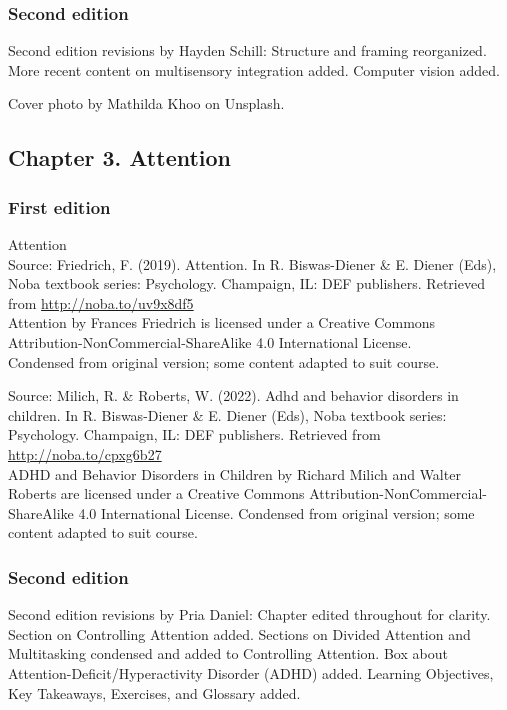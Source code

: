 \documentclass[
]{krantz}
\begin{document}
\subsubsection*{Second edition}\label{second-edition-2}


Second edition revisions by Hayden Schill: Structure and framing reorganized. More recent content on multisensory integration added. Computer vision added.

Cover photo by Mathilda Khoo on Unsplash.

\subsection*{Chapter 3. Attention}\label{chapter-3.-attention}


\subsubsection*{First edition}\label{first-edition-3}


Attention\\
Source: Friedrich, F. (2019). Attention. In R. Biswas-Diener \& E. Diener (Eds), Noba textbook series: Psychology. Champaign, IL: DEF publishers. Retrieved from \url{http://noba.to/uv9x8df5}\\
Attention by Frances Friedrich is licensed under a Creative Commons Attribution-NonCommercial-ShareAlike 4.0 International License.\\
Condensed from original version; some content adapted to suit course.

Source: Milich, R. \& Roberts, W. (2022). Adhd and behavior disorders in children. In R. Biswas-Diener \& E. Diener (Eds), Noba textbook series: Psychology. Champaign, IL: DEF publishers. Retrieved from \url{http://noba.to/cpxg6b27}\\
ADHD and Behavior Disorders in Children by Richard Milich and Walter Roberts are licensed under a Creative Commons Attribution-NonCommercial-ShareAlike 4.0 International License.
Condensed from original version; some content adapted to suit course.

\subsubsection*{Second edition}\label{second-edition-3}


Second edition revisions by Pria Daniel: Chapter edited throughout for clarity. Section on Controlling Attention added. Sections on Divided Attention and Multitasking condensed and added to Controlling Attention. Box about Attention-Deficit/Hyperactivity Disorder (ADHD) added. Learning Objectives, Key Takeaways, Exercises, and Glossary added.
\end{document}
